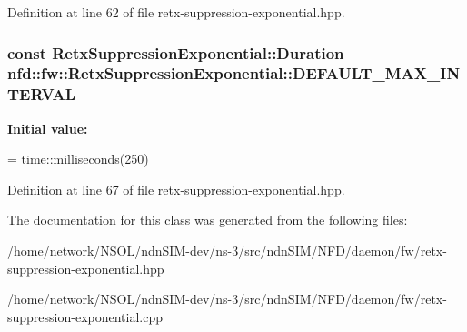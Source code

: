 Definition at line 62 of file retx-\/suppression-\/exponential.\+hpp.

\subsubsection[{\texorpdfstring{D\+E\+F\+A\+U\+L\+T\+\_\+\+M\+A\+X\+\_\+\+I\+N\+T\+E\+R\+V\+AL}{DEFAULT\_MAX\_INTERVAL}}]{\setlength{\rightskip}{0pt plus 5cm}const {\bf Retx\+Suppression\+Exponential\+::\+Duration} nfd\+::fw\+::\+Retx\+Suppression\+Exponential\+::\+D\+E\+F\+A\+U\+L\+T\+\_\+\+M\+A\+X\+\_\+\+I\+N\+T\+E\+R\+V\+AL\hspace{0.3cm}{\ttfamily [static]}}\hypertarget{classnfd_1_1fw_1_1RetxSuppressionExponential_aead556e60aa06b22f8d395601d0d3500}{}\label{classnfd_1_1fw_1_1RetxSuppressionExponential_aead556e60aa06b22f8d395601d0d3500}
{\bfseries Initial value\+:}
\begin{DoxyCode}
=
    time::milliseconds(250)
\end{DoxyCode}


Definition at line 67 of file retx-\/suppression-\/exponential.\+hpp.



The documentation for this class was generated from the following files\+:\begin{DoxyCompactItemize}
\item 
/home/network/\+N\+S\+O\+L/ndn\+S\+I\+M-\/dev/ns-\/3/src/ndn\+S\+I\+M/\+N\+F\+D/daemon/fw/retx-\/suppression-\/exponential.\+hpp\item 
/home/network/\+N\+S\+O\+L/ndn\+S\+I\+M-\/dev/ns-\/3/src/ndn\+S\+I\+M/\+N\+F\+D/daemon/fw/retx-\/suppression-\/exponential.\+cpp\end{DoxyCompactItemize}
